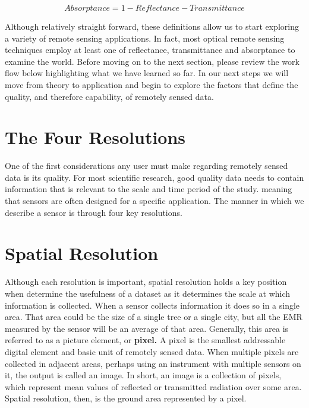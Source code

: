 \documentclass[
]{book}
\begin{document}
\begin{equation}
Absorptance = 1 - Reflectance - Transmittance 
\label{eq:absorptance}
\end{equation}

Although relatively straight forward, these definitions allow us to start exploring a variety of remote sensing applications. In fact, most optical remote sensing techniques employ at least one of reflectance, transmittance and absorptance to examine the world. Before moving on to the next section, please review the work flow below highlighting what we have learned so far. In our next steps we will move from theory to application and begin to explore the factors that define the quality, and therefore capability, of remotely sensed data.

\section{The Four Resolutions}\label{the-four-resolutions}

One of the first considerations any user must make regarding remotely sensed data is its quality. For most scientific research, good quality data needs to contain information that is relevant to the scale and time period of the study. meaning that sensors are often designed for a specific application. The manner in which we describe a sensor is through four key resolutions.

\section{Spatial Resolution}\label{spatial-resolution}

Although each resolution is important, spatial resolution holds a key position when determine the usefulness of a dataset as it determines the scale at which information is collected. When a sensor collects information it does so in a single area. That area could be the size of a single tree or a single city, but all the EMR measured by the sensor will be an average of that area. Generally, this area is referred to as a picture element, or \textbf{pixel.} A pixel is the smallest addressable digital element and basic unit of remotely sensed data. When multiple pixels are collected in adjacent areas, perhaps using an instrument with multiple sensors on it, the output is called an image. In short, an image is a collection of pixels, which represent mean values of reflected or transmitted radiation over some area. Spatial resolution, then, is the ground area represented by a pixel.
\end{document}
